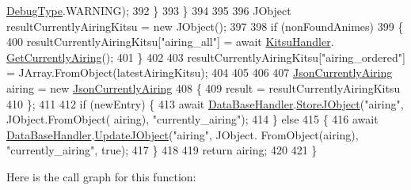 \begin{DoxyCode}
      \mbox{\hyperlink{namespace_little_weeb_library_1_1_handlers_ab66019ed40462876ec4e61bb3ccb0a62}{DebugType}}.WARNING);
392                 \}
393             \}
394 
395 
396             JObject resultCurrentlyAiringKitsu = \textcolor{keyword}{new} JObject();
397 
398             \textcolor{keywordflow}{if} (nonFoundAnimes)
399             \{
400                 resultCurrentlyAiringKitsu[\textcolor{stringliteral}{"airing\_all"}] = await \mbox{\hyperlink{class_little_weeb_library_1_1_handlers_1_1_anime_profile_handler_adf3e37895c7834c51b436beed19d1aa5}{KitsuHandler}}.
      \mbox{\hyperlink{interface_little_weeb_library_1_1_handlers_1_1_i_kitsu_handler_a644c9e4caf1db5de18a78fe03b33e278}{GetCurrentlyAiring}}();
401             \}
402 
403             resultCurrentlyAiringKitsu[\textcolor{stringliteral}{"airing\_ordered"}] = JArray.FromObject(latestAiringKitsu);
404 
405 
406 
407             \mbox{\hyperlink{class_little_weeb_library_1_1_models_1_1_json_currently_airing}{JsonCurrentlyAiring}} airing = \textcolor{keyword}{new} 
      \mbox{\hyperlink{class_little_weeb_library_1_1_models_1_1_json_currently_airing}{JsonCurrentlyAiring}}
408             \{
409                 result = resultCurrentlyAiringKitsu
410             \};
411 
412             \textcolor{keywordflow}{if} (newEntry) \{
413                 await \mbox{\hyperlink{class_little_weeb_library_1_1_handlers_1_1_anime_profile_handler_a4764b15d1f2aaf7d21aa461508a08a62}{DataBaseHandler}}.\mbox{\hyperlink{interface_little_weeb_library_1_1_handlers_1_1_i_data_base_handler_a5d87c42ef7dc7e5d86f7e6fada3454e9}{StoreJObject}}(\textcolor{stringliteral}{"airing"}, JObject.FromObject(
      airing), \textcolor{stringliteral}{"currently\_airing"});
414             \} \textcolor{keywordflow}{else}
415             \{
416                 await \mbox{\hyperlink{class_little_weeb_library_1_1_handlers_1_1_anime_profile_handler_a4764b15d1f2aaf7d21aa461508a08a62}{DataBaseHandler}}.\mbox{\hyperlink{interface_little_weeb_library_1_1_handlers_1_1_i_data_base_handler_a00c429576be33aa60bdf1a88edaf88c6}{UpdateJObject}}(\textcolor{stringliteral}{"airing"}, JObject.
      FromObject(airing), \textcolor{stringliteral}{"currently\_airing"}, \textcolor{keyword}{true}); 
417             \}
418 
419             \textcolor{keywordflow}{return} airing;
420 
421         \}
\end{DoxyCode}
Here is the call graph for this function\+:\nopagebreak
